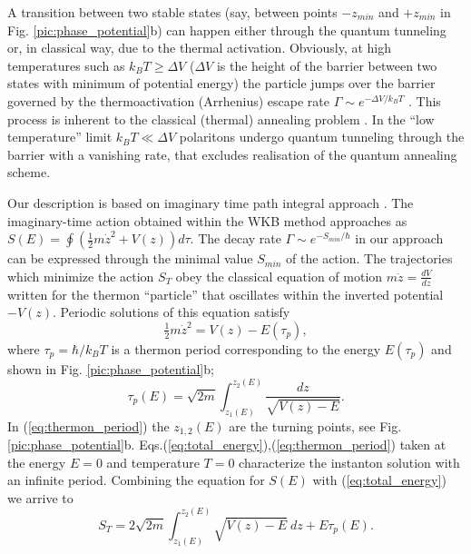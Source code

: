 \documentclass[fleqn,10pt]{wlscirep}
\begin{document}
A transition between two stable states (say, between points $-z_{min}$ and $+z_{min}$ in Fig. \ref{pic:phase_potential}b) can happen  either through the quantum tunneling or, in classical way, due to the thermal activation. 
Obviously, at high temperatures such as $k_{B}T\ge\Delta V$ ($\Delta V$ is the height of the barrier between two states with minimum of potential energy) the particle jumps over the barrier governed by the thermoactivation (Arrhenius) escape rate $\Gamma \sim e^{-\Delta V /k_{B}T}$ \cite{Larkin}. This process is inherent to the classical (thermal) annealing problem \cite{Das}. 
In the ``low temperature'' limit $k_{B}T\ll\Delta V$ polaritons undergo quantum tunneling through the barrier with a vanishing rate, that excludes realisation of the quantum annealing scheme.

Our description is based on imaginary time path integral approach \cite{Ankerhold}.
The imaginary-time action obtained within the WKB method approaches as $S(E) = \oint (\tfrac{1}{2} m \dot{z}^2 + V(z)) d \tau$.
The decay rate $\Gamma \sim e^{-S_{min}/\hbar}$ in our approach can be expressed through the minimal value $S_{min}$ of the action.
The trajectories which minimize the action $S_T$ obey the classical equation of motion $m \ddot{z} = \frac{d V}{dz}$ written for the thermon ``particle'' that oscillates within the inverted potential $-V(z)$.
Periodic solutions of this equation satisfy
%
\begin{equation}
\tfrac{1}{2} m \dot{z}^2 = V(z) - E(\tau_p),
\label{eq:total_energy}
\end{equation}
%
where $\tau_p = \hbar / k_B T$ is a thermon period corresponding to the energy $E(\tau_p)$ and shown in Fig. \ref{pic:phase_potential}b;
%
\begin{equation}
\tau_p(E) = \sqrt{2 m} \int_{z_1(E)}^{z_2(E)} \frac{dz}{\sqrt{V(z) - E}}.
\label{eq:thermon_period}
\end{equation}
%
In (\ref{eq:thermon_period}) the $z_{1,2}(E)$ are the turning points, see Fig. \ref{pic:phase_potential}b.
Eqs.(\ref{eq:total_energy}),(\ref{eq:thermon_period}) taken at the energy $E = 0$ and temperature $T = 0$ characterize the instanton solution with an infinite period.
Combining the equation for $S(E)$ 
with (\ref{eq:total_energy}) we arrive to 
%
\begin{equation}
S_T = 2 \sqrt{2 m} \int_{z_1(E)}^{z_2(E)} \sqrt{V(z) - E} ~dz + E \tau_p (E).
\label{eq:thermon_action_2}
\end{equation}
%
\end{document}
